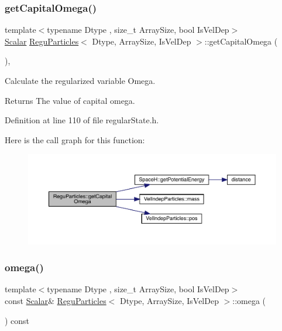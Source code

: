 \subsubsection{\texorpdfstring{get\+Capital\+Omega()}{getCapitalOmega()}}
{\footnotesize\ttfamily template$<$typename Dtype , size\+\_\+t Array\+Size, bool Is\+Vel\+Dep$>$ \\
\mbox{\hyperlink{class_vel_indep_particles_a5d275b22f0d759f360ddd80e78f4b466}{Scalar}} \mbox{\hyperlink{class_regu_particles}{Regu\+Particles}}$<$ Dtype, Array\+Size, Is\+Vel\+Dep $>$\+::get\+Capital\+Omega (\begin{DoxyParamCaption}{ }\end{DoxyParamCaption})\hspace{0.3cm}{\ttfamily [inline]}, {\ttfamily [protected]}}



Calculate the regularized variable Omega. 

\begin{DoxyReturn}{Returns}
The value of capital omega. 
\end{DoxyReturn}


Definition at line 110 of file regular\+State.\+h.

Here is the call graph for this function\+:\nopagebreak
\begin{figure}[H]
\begin{center}
\leavevmode
\includegraphics[width=350pt]{class_regu_particles_aee55f0e2663334407455761a49abd087_cgraph}
\end{center}
\end{figure}
\mbox{\label{class_regu_particles_a25cb4d03608826aa5adc943d58cb5b49}} 
\subsubsection{\texorpdfstring{omega()}{omega()}}
{\footnotesize\ttfamily template$<$typename Dtype , size\+\_\+t Array\+Size, bool Is\+Vel\+Dep$>$ \\
const \mbox{\hyperlink{class_vel_indep_particles_a5d275b22f0d759f360ddd80e78f4b466}{Scalar}}\& \mbox{\hyperlink{class_regu_particles}{Regu\+Particles}}$<$ Dtype, Array\+Size, Is\+Vel\+Dep $>$\+::omega (\begin{DoxyParamCaption}{ }\end{DoxyParamCaption}) const\hspace{0.3cm}{\ttfamily [inline]}}



